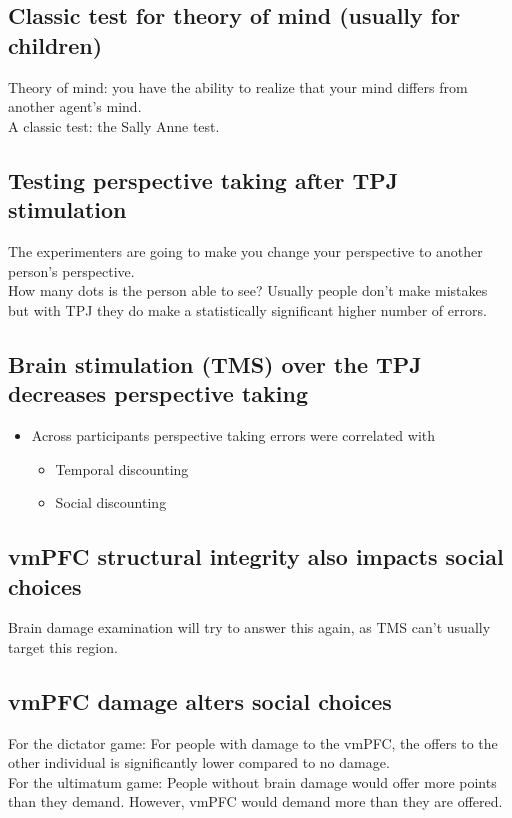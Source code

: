 \subsection{Classic test for theory of mind (usually for children)}
Theory of mind: you have the ability to realize that your mind differs from another agent's mind.
\\A classic test: the Sally Anne test.
\subsection{Testing perspective taking after TPJ stimulation}
The experimenters are going to make you change your perspective to another person's perspective.
\\How many dots is the person able to see? Usually people don't make mistakes but with TPJ they do make a statistically significant higher number of errors.

\subsection{Brain stimulation (TMS) over the TPJ decreases perspective taking}
\begin{itemize}
    \item Across participants perspective taking errors were correlated with
    \begin{itemize}
        \item Temporal discounting 
        \item Social discounting
    \end{itemize}

    
\end{itemize}

 \subsection{vmPFC structural integrity also impacts social choices}
 Brain damage examination will try to answer this again, as TMS can't usually target this region.
 \subsection{vmPFC damage alters social choices}
 For the dictator game:  For people with damage to the vmPFC, the offers to the other individual is significantly lower compared to no damage. 
 \\For the ultimatum game: People without brain damage would offer more points than they demand. However, vmPFC would demand more than they are offered.
